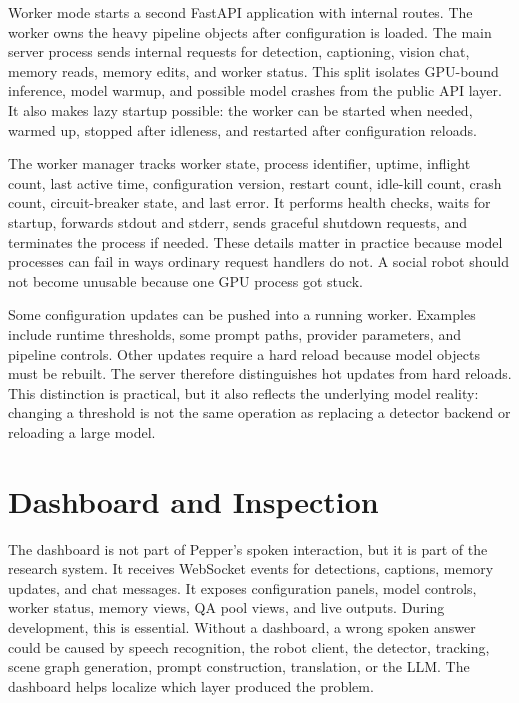 Worker mode starts a second FastAPI application with internal routes. The worker owns the heavy pipeline objects after configuration is loaded. The main server process sends internal requests for detection, captioning, vision chat, memory reads, memory edits, and worker status. This split isolates GPU-bound inference, model warmup, and possible model crashes from the public API layer. It also makes lazy startup possible: the worker can be started when needed, warmed up, stopped after idleness, and restarted after configuration reloads.

The worker manager tracks worker state, process identifier, uptime, inflight count, last active time, configuration version, restart count, idle-kill count, crash count, circuit-breaker state, and last error. It performs health checks, waits for startup, forwards stdout and stderr, sends graceful shutdown requests, and terminates the process if needed. These details matter in practice because model processes can fail in ways ordinary request handlers do not. A social robot should not become unusable because one GPU process got stuck.

Some configuration updates can be pushed into a running worker. Examples include runtime thresholds, some prompt paths, provider parameters, and pipeline controls. Other updates require a hard reload because model objects must be rebuilt. The server therefore distinguishes hot updates from hard reloads. This distinction is practical, but it also reflects the underlying model reality: changing a threshold is not the same operation as replacing a detector backend or reloading a large model.

\section{Dashboard and Inspection}\label{sec:server-dashboard}

The dashboard is not part of Pepper's spoken interaction, but it is part of the research system. It receives WebSocket events for detections, captions, memory updates, and chat messages. It exposes configuration panels, model controls, worker status, memory views, QA pool views, and live outputs. During development, this is essential. Without a dashboard, a wrong spoken answer could be caused by speech recognition, the robot client, the detector, tracking, scene graph generation, prompt construction, translation, or the LLM. The dashboard helps localize which layer produced the problem.

